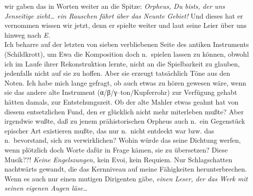 \documentclass[
]{article}
\begin{document}
wir gaben das in Worten weiter an die Spitze: \emph{Orpheus, Du
bist\textquotesingle s, der uns Jenseitige zieht\ldots{} ein Rauschen
fährt über das Neunte Gebiet! }Und dieses hat er vernommen wissen wir
jetzt, denn er spielte weiter und laut seine Leier über uns hinweg nach
\emph{E.}\\
Ich beharre auf der letzten von sieben verbliebenen Seite des antiken
Instruments (Schildkrott), um Ewa die Komposition doch n.~spielen lassen
zu können, obwohl ich im Laufe ihrer Rekonstruktion lernte, nicht an die
Spielbarkeit zu glauben, jedenfalls nicht auf sie zu hoffen. Aber sie
erzeugt tatsächlich Töne aus den Noten. Ich habe mich lange gefragt, ob
auch etwas zu hören gewesen wäre, wenn sie das andere alte Instrument
(α/β/γ--ton/Kupferrohr) zur Verfügung gehabt hätten damals, zur
Entstehungszeit. Ob der alte Mahler etwas geahnt hat von diesem
entsetzlichen Fund, den er glücklich nicht mehr miterleben mußte? Aber
irgendwie wußte, daß zu jenem prähistorischen Orpheus auch n.~ein
Gegenstück epischer Art existieren mußte, das nur n.~nicht entdeckt war
bzw. das n.~bevorstand, sich zu verwirklichen? Wohin würde das seine
Dichtung werfen, wenn plötzlich doch Worte dafür in Frage kämen, sie zu
übersetzen? Diese Musik??! \emph{Keine Engelszungen, }kein Evoi, kein
Requiem. Nur Schlagschatten nachtwärts gewandt, die das Kernniveau auf
meine Fähigkeiten herunterbrechen. Wenn es auch nur einen mutigen
Dirigenten gäbe, \emph{einen Leser, der das Werk mit seinen eigenen
Augen läse\ldots{}}
\end{document}
